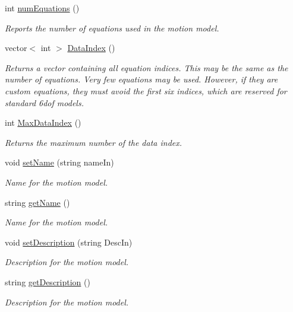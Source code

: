 \begin{DoxyCompactItemize}
int \hyperlink{classmotion_model_ac0f0cef68dc8d4751ba3f6e5c48345ec}{num\-Equations} ()
\begin{DoxyCompactList}\small\item\em Reports the number of equations used in the motion model. \end{DoxyCompactList}\item 
vector$<$ int $>$ \hyperlink{classmotion_model_aefe2ac7a2420f4d21d273ed1914552df}{Data\-Index} ()
\begin{DoxyCompactList}\small\item\em Returns a vector containing all equation indices. This may be the same as the number of equations. Very few equations may be used. However, if they are custom equations, they must avoid the first six indices, which are reserved for standard 6dof models. \end{DoxyCompactList}\item 
int \hyperlink{classmotion_model_ab258ade049ddc4a33c1b767a6eeaee78}{Max\-Data\-Index} ()
\begin{DoxyCompactList}\small\item\em Returns the maximum number of the data index. \end{DoxyCompactList}\item 
void \hyperlink{classmotion_model_a3f0eb19e2afbd7112c5b98ae61a61efe}{set\-Name} (string name\-In)
\begin{DoxyCompactList}\small\item\em Name for the motion model. \end{DoxyCompactList}\item 
string \hyperlink{classmotion_model_ae2861e229b0a12fda786afba72a7f91a}{get\-Name} ()
\begin{DoxyCompactList}\small\item\em Name for the motion model. \end{DoxyCompactList}\item 
void \hyperlink{classmotion_model_a452c04742bda0518e685a11b49a80dbd}{set\-Description} (string Desc\-In)
\begin{DoxyCompactList}\small\item\em Description for the motion model. \end{DoxyCompactList}\item 
string \hyperlink{classmotion_model_a30e279e5aab4293571f94e85f3590bbd}{get\-Description} ()
\begin{DoxyCompactList}\small\item\em Description for the motion model. \end{DoxyCompactList}\end{DoxyCompactItemize}


